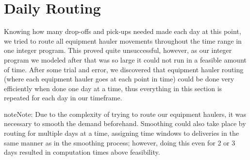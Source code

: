 \documentclass[letterpaper,10pt,english]{sphinxmanual}
\begin{document}
\chapter{Daily Routing}
\label{\detokenize{daily-routing:daily-routing}}\label{\detokenize{daily-routing::doc}}\label{\detokenize{daily-routing:id1}}
Knowing how many drop-offs and pick-ups needed made each day at this point,
we tried to route all equipment hauler movements throughout the time range in
one integer program. This proved quite unsuccessful, however, as our integer
program we modeled after that was so large it could not run in a feasible
amount of time. After some trial and error, we discovered that equipment
hauler routing (where each equipment hauler goes at each point in time) could
be done very efficiently when done one day at a time, thus everything in this
section is repeated for each day in our timeframe.

\begin{sphinxadmonition}{note}{Note:}
Due to the complexity of trying to route our equipment haulers, it was
necessary to smooth the demand beforehand. Smoothing could also take
place by routing for multiple days at a time, assigning time windows to
deliveries in the same manner as in the smoothing process; however, doing
this even for 2 or 3 days resulted in computation times above feasibility.
\end{sphinxadmonition}
\end{document}
